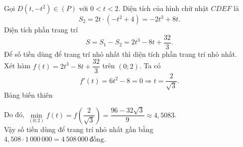\begin{ex}
{\begin{itemchoice}
			\itemch Gọi $D\left(t,-t^2\right)\in(P)$ với $0<t<2$. Diện tích của hình chữ nhật $CDEF$ là\\
			\[S_2=2t\cdot \left(-t^2+4\right)=-2t^3+8t.\]
			Diện tích phần trang trí
			\[S=S_1-S_2=2t^3-8t+\dfrac{32}{3}.\]
			Để số tiền dùng để trang trí nhỏ nhất thì diện tích phần trang trí nhỏ nhất.\\
			Xét hàm $f(t)=2t^3-8t+\dfrac{32}{3}$ trên $(0;2)$. Ta có
			\[f'(t)=6t^2-8=0\Rightarrow t= \dfrac{2}{\sqrt{3}}.\]
				Bảng biến thiên
				\begin{center}
				\end{center}
			Do đó, $\min\limits_{(0;2)}f(t)=f\left(\dfrac{2}{\sqrt{3}}\right)=\dfrac{96-32\sqrt{3}}{9}\approx 4{,}5083$.\\
				Vậy số tiền dùng để trang trí nhỏ nhất gần bằng	$4{,}508\cdot 1\,000\,000=4\,508\,000\ \text{đồng}.$
		\end{itemchoice}
	}
\end{ex}

